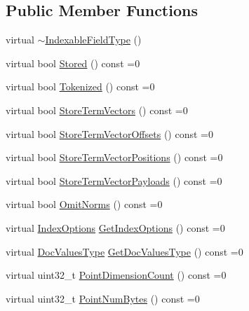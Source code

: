 \subsection*{Public Member Functions}
\begin{DoxyCompactItemize}
\item 
virtual \mbox{\hyperlink{classlucene_1_1core_1_1index_1_1IndexableFieldType_a501a380eb9052e6b92aaa96fabc2e8e7}{$\sim$\+Indexable\+Field\+Type}} ()
\item 
virtual bool \mbox{\hyperlink{classlucene_1_1core_1_1index_1_1IndexableFieldType_a0f394bc94f0920220a59214e52c0e9ef}{Stored}} () const =0
\item 
virtual bool \mbox{\hyperlink{classlucene_1_1core_1_1index_1_1IndexableFieldType_a107c742e5d273bbf4d1b36da7509c9ad}{Tokenized}} () const =0
\item 
virtual bool \mbox{\hyperlink{classlucene_1_1core_1_1index_1_1IndexableFieldType_a21794361c1b7739d8cb8e11a39e23970}{Store\+Term\+Vectors}} () const =0
\item 
virtual bool \mbox{\hyperlink{classlucene_1_1core_1_1index_1_1IndexableFieldType_a2e9b5d67129a715da34e642a74690099}{Store\+Term\+Vector\+Offsets}} () const =0
\item 
virtual bool \mbox{\hyperlink{classlucene_1_1core_1_1index_1_1IndexableFieldType_aad7c41e8fcf68b958dabb383525c1897}{Store\+Term\+Vector\+Positions}} () const =0
\item 
virtual bool \mbox{\hyperlink{classlucene_1_1core_1_1index_1_1IndexableFieldType_ab286c5d9995b85a8b0a45d3d0e49d905}{Store\+Term\+Vector\+Payloads}} () const =0
\item 
virtual bool \mbox{\hyperlink{classlucene_1_1core_1_1index_1_1IndexableFieldType_afc45bc2031d22fc941ea89b1ba881526}{Omit\+Norms}} () const =0
\item 
virtual \mbox{\hyperlink{namespacelucene_1_1core_1_1index_a0d5e1f98471a76de106056cf3b5a7897}{Index\+Options}} \mbox{\hyperlink{classlucene_1_1core_1_1index_1_1IndexableFieldType_afe678be1fafcb17c6142fc662ee793e4}{Get\+Index\+Options}} () const =0
\item 
virtual \mbox{\hyperlink{namespacelucene_1_1core_1_1index_a2f7ffaef6429b5df542c8aa12f8b9883}{Doc\+Values\+Type}} \mbox{\hyperlink{classlucene_1_1core_1_1index_1_1IndexableFieldType_a3caeba48e5779f266829e82b9d45e996}{Get\+Doc\+Values\+Type}} () const =0
\item 
virtual uint32\+\_\+t \mbox{\hyperlink{classlucene_1_1core_1_1index_1_1IndexableFieldType_a14e8fab7ab6c22ed05a9049767b88e4b}{Point\+Dimension\+Count}} () const =0
\item 
virtual uint32\+\_\+t \mbox{\hyperlink{classlucene_1_1core_1_1index_1_1IndexableFieldType_aaf9f4d10246fa5e7b0265d11774883ef}{Point\+Num\+Bytes}} () const =0
\end{DoxyCompactItemize}



